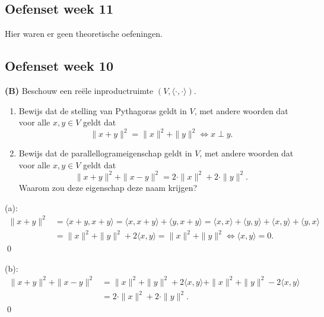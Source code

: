 \subsection{Oefenset week 11}
Hier waren er geen theoretische oefeningen.
\subsection{Oefenset week 10}

\begin{oefening}[8.2.5] \textbf{(B)}
    Beschouw een reële inproductruimte $(V, \langle \cdot, \cdot \rangle)$.
    \begin{enumerate}
        \item[(a)] Bewijs dat de stelling van Pythagoras geldt in $V$, met andere woorden dat voor alle $x, y \in V$ geldt dat
        \[ \|x + y\|^2 = \|x\|^2 + \|y\|^2 \iff x \perp y. \]
        \item[(b)] Bewijs dat de parallellogrameigenschap geldt in $V$, met andere woorden dat voor alle $x, y \in V$ geldt dat
        \[ \|x + y\|^2 + \|x - y\|^2 = 2 \cdot \|x\|^2 + 2 \cdot \|y\|^2. \]
        Waarom zou deze eigenschap deze naam krijgen?
    \end{enumerate}

    (a):
    \begin{align*}
    \|x + y\|^2
    &= \langle x+y,x+y \rangle
    = \langle x,x+y \rangle + \langle y,x+y \rangle
    = \langle x,x \rangle + \langle y,y \rangle + \langle x,y \rangle + \langle y,x \rangle\\
    &= \|x\|^2 + \|y\|^2 + 2 \langle x,y \rangle
    = \|x\|^2 + \|y\|^2 \iff \langle x,y \rangle = 0.
    \end{align*}\qed

    (b):
    \begin{align*}
        \|x + y\|^2 + \|x - y\|^2
        &= \|x\|^2 + \|y\|^2 + 2 \langle x,y \rangle + \|x\|^2 + \|y\|^2 - 2 \langle x,y \rangle \\
        &= 2 \cdot \|x\|^2 + 2 \cdot \|y\|^2.
    \end{align*}\qed
\end{oefening}


